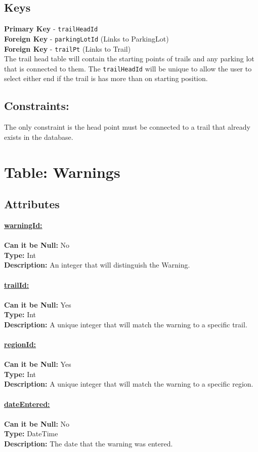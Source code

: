 \subsection{Keys}
\textbf{Primary Key} - \texttt{trailHeadId}\\
\textbf{Foreign Key} - \texttt{parkingLotId} (Links to ParkingLot)\\
\textbf{Foreign Key} - \texttt{trailPt} (Links to Trail)\\
The trail head table will contain the starting points of trails
and any parking lot that is connected to them. The \texttt{trailHeadId} will be 
unique to allow the user to select either end if the trail is has
more than on starting position. 

\subsection{Constraints:}
The only constraint is the head point must be connected to a trail 
that already exists in the database.



\newpage
\section{Table: Warnings}
\subsection{Attributes}
\textbf{\underline{warningId:}}\\
\\
\textbf{Can it be Null:} No\\
\textbf{Type:} Int\\
\textbf{Description:}
An integer that will distinguish the Warning.\\\\
\textbf{\underline{trailId:}}\\
\\
\textbf{Can it be Null:} Yes\\
\textbf{Type:} Int\\
\textbf{Description:}
A unique integer that will match the warning to a specific trail. \\\\
\textbf{\underline{regionId:}}\\ %
\\
\textbf{Can it be Null:} Yes\\
\textbf{Type:} Int\\
\textbf{Description:}
A unique integer that will match the warning to a specific region. \\\\
\textbf{\underline{dateEntered:}}\\ 
\\
\textbf{Can it be Null:} No\\
\textbf{Type:} DateTime\\
\textbf{Description:}
The date that the warning was entered.\\\\

